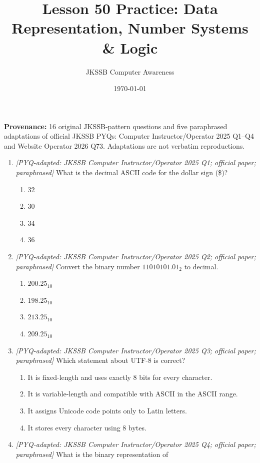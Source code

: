 \documentclass[11pt]{article}
\title{Lesson 50 Practice: Data Representation, Number Systems \& Logic}
\author{JKSSB Computer Awareness}
\date{\today}
\begin{document}
\maketitle
\noindent\textbf{Provenance:} 16 original JKSSB-pattern questions and five
paraphrased adaptations of official JKSSB PYQs: Computer Instructor/Operator
2025 Q1--Q4 and Website Operator 2026 Q73. Adaptations are not verbatim
reproductions.

\begin{enumerate}[label=\textbf{Q\arabic*.}, leftmargin=*]
\item \textit{[PYQ-adapted: JKSSB Computer Instructor/Operator 2025 Q1;
official paper; paraphrased]} What is the decimal ASCII code for the dollar
sign (\$)?
  \begin{enumerate}[label=\Alph*.]
    \item 32
    \item 30
    \item 34
    \item 36
  \end{enumerate}
\item \textit{[PYQ-adapted: JKSSB Computer Instructor/Operator 2025 Q2;
official paper; paraphrased]} Convert the binary number
$11010101.01_2$ to decimal.
  \begin{enumerate}[label=\Alph*.]
    \item $200.25_{10}$
    \item $198.25_{10}$
    \item $213.25_{10}$
    \item $209.25_{10}$
  \end{enumerate}
\item \textit{[PYQ-adapted: JKSSB Computer Instructor/Operator 2025 Q3;
official paper; paraphrased]} Which statement about UTF-8 is correct?
  \begin{enumerate}[label=\Alph*.]
    \item It is fixed-length and uses exactly 8 bits for every character.
    \item It is variable-length and compatible with ASCII in the ASCII range.
    \item It assigns Unicode code points only to Latin letters.
    \item It stores every character using 8 bytes.
  \end{enumerate}
\item \textit{[PYQ-adapted: JKSSB Computer Instructor/Operator 2025 Q4;
official paper; paraphrased]} What is the binary representation of

\end{enumerate}
\end{document}
